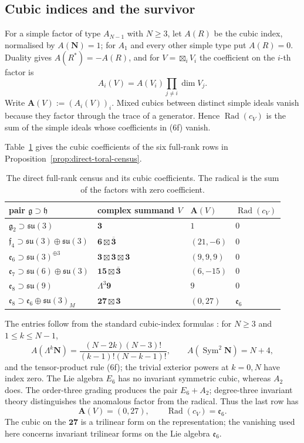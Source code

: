 \documentclass[11pt]{article}
\theoremstyle{remark}
\newcommand{\g}{\mathfrak g}
\newcommand{\h}{\mathfrak h}
\newcommand{\e}{\mathfrak e}
\newcommand{\su}{\mathfrak{su}}
\newcommand{\Rad}{\operatorname{Rad}}
\newcommand{\boxt}{\boxtimes}
\begin{document}
\subsection{Cubic indices and the survivor}

For a simple factor of type \(A_{N-1}\) with \(N\ge3\), let \(A(R)\) be the
cubic index, normalised by \(A(\mathbf N)=1\); for \(A_1\) and every other simple type put
\(A(R)=0\).  Duality gives \(A(R^*)=-A(R)\), and for
\(V=\boxtimes_iV_i\) the coefficient on the \(i\)-th factor is
\[
 A_i(V)=A(V_i)\prod_{j\ne i}\dim V_j. \tag{6f}
\]
Write \(\mathbf A(V):=(A_i(V))_i\).
Mixed cubics between distinct simple ideals vanish because they factor
through the trace of a generator.  Hence \(\Rad(c_V)\) is the sum of the
simple ideals whose coefficients in \textup{(6f)} vanish.

Table~\ref{tab:direct-census} gives the cubic coefficients of the six
full-rank rows in Proposition~\ref{prop:direct-toral-census}.
\begin{table}[!t]
\centering
\caption{The direct full-rank census and its cubic coefficients.  The
radical is the sum of the factors with zero coefficient.}
\label{tab:direct-census}
\small
\renewcommand{\arraystretch}{1.12}
\setlength{\tabcolsep}{5pt}
\begin{tabular}{@{}llll@{}}
\toprule
pair \(\g\supset\h\) & complex summand \(V\) & \(\mathbf A(V)\) &
\(\Rad(c_V)\)\\
\midrule
\(\mathfrak g_2\supset\su(3)\)
 & \(\mathbf3\) & \(1\) & \(0\)\\
\(\mathfrak f_4\supset\su(3)\oplus\su(3)\)
 & \(\mathbf6\boxt\overline{\mathbf3}\) & \((21,-6)\) & \(0\)\\
\(\e_6\supset\su(3)^{\oplus3}\)
 & \(\mathbf3\boxt\mathbf3\boxt\mathbf3\) & \((9,9,9)\) & \(0\)\\
\(\e_7\supset\su(6)\oplus\su(3)\)
 & \(\mathbf{15}\boxt\overline{\mathbf3}\) & \((6,-15)\) & \(0\)\\
\(\e_8\supset\su(9)\)
 & \(\Lambda^3\mathbf9\) & \(9\) & \(0\)\\
\(\e_8\supset\e_6\oplus\su(3)_M\)
 & \(\mathbf{27}\boxt\mathbf3\) & \((0,27)\) & \(\e_6\)\\
\bottomrule
\end{tabular}
\end{table}

The entries follow from the standard cubic-index formulas
\cite{Slansky,McKayPatera}: for \(N\ge3\) and \(1\le k\le N-1\),
\[
 A(\Lambda^k\mathbf N)
 =\frac{(N-2k)(N-3)!}{(k-1)!(N-k-1)!},
 \qquad
 A(\operatorname{Sym}^2\mathbf N)=N+4,
\]
and the tensor-product rule \textup{(6f)}; the trivial exterior powers at
\(k=0,N\) have index zero.  The Lie algebra \(E_6\) has no
invariant symmetric cubic, whereas \(A_2\) does.  The order-three grading
produces the pair \(E_6+A_2\); degree-three invariant theory distinguishes
the anomalous factor from the radical.  Thus the last row has
\[
 \mathbf A(V)=(0,27),\qquad \Rad(c_V)=\e_6.
\]
The cubic on the \(\mathbf{27}\) is a trilinear form on the representation;
the vanishing used here concerns invariant trilinear forms on the Lie algebra
\(\e_6\).
\end{document}
